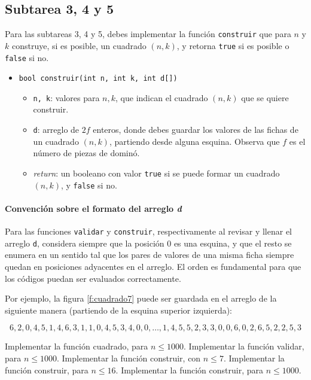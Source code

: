 \documentclass{oci}
\begin{document}
\subsection*{Subtarea 3, 4 y 5}
Para las subtareas 3, 4 y 5, debes implementar la función \verb+construir+ que para $n$ y $k$ construye, si es posible, un cuadrado $(n,k)$, y retorna \verb+true+ si es posible o \verb+false+ si no.
\begin{itemize}
 \item \verb+bool construir(int n, int k, int d[])+
 \begin{itemize}
  \item \verb+n, k+: valores para $n,k$, que indican el cuadrado $(n,k)$ que se quiere construir.
  \item \verb+d+: arreglo de $2f$ enteros, donde debes guardar los valores de las fichas de un cuadrado $(n,k)$, partiendo desde alguna esquina. Observa que $f$ es el número de piezas de dominó.
  \item \emph{return}: un booleano con valor \verb+true+ si se puede formar un cuadrado $(n,k)$, y \verb+false+ si no.
 \end{itemize}
\end{itemize}

\paragraph{Convención sobre el formato del arreglo \emph{d}}
Para las funciones \verb+validar+ y \verb+construir+, respectivamente al revisar y llenar el arreglo \verb+d+, considera siempre que la posición 0 es una esquina, y que el resto se enumera en un sentido tal que los pares de valores de una misma ficha siempre quedan en posiciones adyacentes en el arreglo. El orden es fundamental para que los códigos puedan ser evaluados correctamente.

Por ejemplo, la figura \ref{f:cuadrado7} puede ser guardada en el arreglo de la siguiente manera (partiendo de la esquina superior izquierda):

\[ 6, 2, 0, 4, 5, 1, 4, 6, 3, 1, 1, 0, 4, 5, 3, 4, 0, 0, \dots, 1, 4, 5, 5, 2, 3, 3, 0, 0, 6, 0, 2, 6, 5, 2, 2, 5, 3 \]

\begin{scoreDescription}
   Implementar la función cuadrado, para $n \le 1000$.
   Implementar la función validar, para $n \le 1000$.
   Implementar la función construir, con $n \le 7$.
   Implementar la función construir, para $n \le 16$.
   Implementar la función construir, para $n \le 1000$.
\end{scoreDescription}
\end{document}
